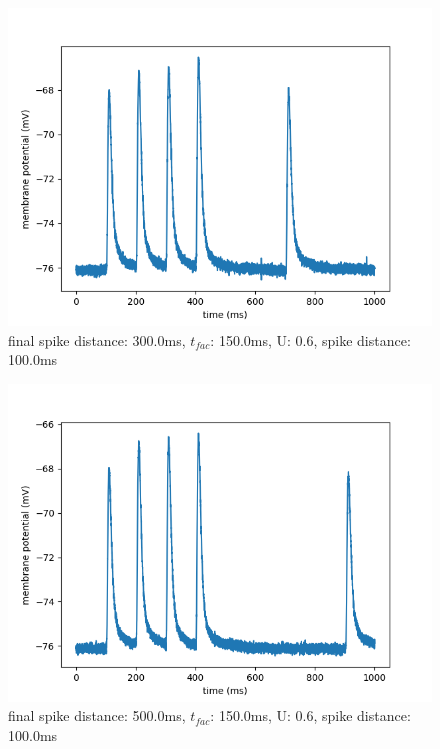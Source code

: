 \documentclass[10pt,a4paper]{scrartcl}
\begin{document}
\begin{figure} [ht]
\begin{center}
\label{fig:abb25}
\caption{final spike distance: 300.0ms, $t_{fac}$: 150.0ms, U: 0.6, spike distance: 100.0ms}
\includegraphics[scale=0.35]{pictures/final_spike_variation_15.pdf} 
\end{center}
\end{figure}

\begin{figure} [ht]
\begin{center}
\label{fig:abb26}
\caption{final spike distance: 500.0ms, $t_{fac}$: 150.0ms, U: 0.6, spike distance: 100.0ms}
\includegraphics[scale=0.35]{pictures/final_spike_variation_16.pdf} 
\end{center}
\end{figure}
\end{document}
